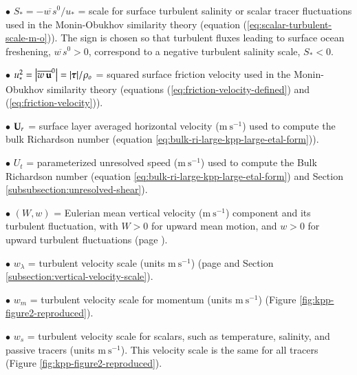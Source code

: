 \begin{trivlist}
\item[$\bullet$] $S_{*} = -\overline{w \, s}^{0} / u_{*}$ = scale for
  surface turbulent salinity or scalar tracer fluctuations used in the
  Monin-Obukhov similarity theory (equation
  (\ref{eq:scalar-turbulent-scale-m-o})).  The sign is chosen so that
  turbulent fluxes leading to surface ocean freshening, $\overline{w
    \, s}^{0} > 0$, correspond to a negative turbulent salinity scale,
  $S_{*} < 0$.

\item[$\bullet$] $u_{*}^{2} = \left| \overline{w \, {\bf u}}^{0}
  \right| = | \mbox{\boldmath $\tau$} |/\rho_{o}$ = squared surface friction velocity
  used in the Monin-Obukhov similarity theory (equations
  (\ref{eq:friction-velocity-defined}) and
  (\ref{eq:friction-velocity})).

\item[$\bullet$] ${\bf U}_{r}$ = surface layer averaged horizontal
  velocity ($\mbox{m}~\mbox{s}^{-1}$) used to compute the bulk
  Richardson number (equation
  \ref{eq:bulk-ri-large-kpp-large-etal-form})).

\item[$\bullet$] $U_{t}$ = parameterized unresolved speed
  ($\mbox{m}~\mbox{s}^{-1}$) used to compute the Bulk Richardson
  number (equation \ref{eq:bulk-ri-large-kpp-large-etal-form}) and
  Section \ref{subsubsection:unresolved-shear}).

\item[$\bullet$] $(W,w)$ = Eulerian mean vertical velocity
  ($\mbox{m}~\mbox{s}^{-1}$) component and its turbulent fluctuation,
  with $W > 0$ for upward mean motion, and $w > 0$ for upward
  turbulent fluctuations (page \pageref{w_W_defined}).

\item[$\bullet$] $w_{\lambda}$ = turbulent velocity scale (units
  $\mbox{m}~\mbox{s}^{-1}$) (page 
  \pageref{subsubsection:turbulent-vertical-velocity-scale} and
  Section \ref{subsection:vertical-velocity-scale}).

\item[$\bullet$] $w_{m}$ = turbulent velocity scale for momentum
  (units $\mbox{m}~\mbox{s}^{-1}$) (Figure
  \ref{fig:kpp-figure2-reproduced}).

\item[$\bullet$] $w_{s}$ = turbulent velocity scale for scalars, such
  as temperature, salinity, and passive tracers (units
  $\mbox{m}~\mbox{s}^{-1}$).  This velocity scale is the same for all
  tracers (Figure \ref{fig:kpp-figure2-reproduced}).


\end{trivlist}
